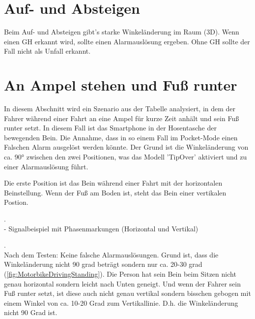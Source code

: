 \section{Auf- und Absteigen} \label{sec:AufAbsteigen} %

Beim Auf- und Absteigen gibt's starke Winkeländerung im Raum (3D). Wenn einen GH erkannt wird, sollte einen Alarmauslösung ergeben. Ohne GH sollte der Fall nicht als Unfall erkannt.



\section{An Ampel stehen und Fuß runter} \label{sec:AmpelStehen} %
In diesem Abschnitt wird ein Szenario aus der Tabelle analysiert, in dem der Fahrer während einer Fahrt an eine Ampel für kurze Zeit anhält und sein Fuß runter setzt. In diesem Fall ist das Smartphone in der Hosentasche der bewegenden Bein.
Die Annahme, dass in so einem Fall im Pocket-Mode einen Falschen Alarm ausgelöst werden könnte. Der Grund ist die Winkeländerung von ca. \ang{90} zwischen den zwei Positionen, was das Modell 'TipOver' aktiviert und zu einer Alarmauslösung führt.

Die erste Position ist das Bein während einer Fahrt mit der horizontalen Beinstellung. Wenn der Fuß am Boden ist, steht das Bein einer vertikalen Postion.

.\\

- Signalbeispiel mit Phasenmarkungen (Horizontal und Vertikal)

.\\


Nach dem Testen: Keine falsche Alarmauslösungen. Grund ist, dass die Winkeländerung nicht 90 grad beträgt sondern nur ca. 20-30 grad (\autoref{fig:MotorbikeDrivingStanding}). Die Person hat sein Bein beim Sitzen nicht genau horizontal sondern leicht nach Unten geneigt. Und wenn der Fahrer sein Fuß runter setzt, ist diese auch nicht genau vertikal sondern bisschen gebogen mit einem Winkel von ca. 10-20 Grad zum Vertikallinie. D.h. die Winkeländerung nicht 90 Grad ist.

